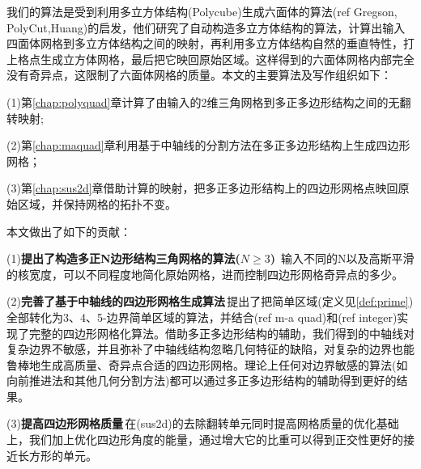我们的算法是受到利用多立方体结构(Polycube)生成六面体的算法(ref Gregson, PolyCut,Huang)的启发，他们研究了自动构造多立方体结构的算法，计算出输入四面体网格到多立方体结构之间的映射，再利用多立方体结构自然的垂直特性，打上格点生成立方体网格，最后把它映回原始区域。这样得到的六面体网格内部完全没有奇异点，这限制了六面体网格的质量。本文的主要算法及写作组织如下：

(1)第\ref{chap:polyquad}章计算了由输入的2维三角网格到多正多边形结构之间的无翻转映射;

(2)第\ref{chap:maquad}章利用基于中轴线的分割方法在多正多边形结构上生成四边形网格；

(3)第\ref{chap:sus2d}章借助计算的映射，把多正多边形结构上的四边形网格点映回原始区域，并保持网格的拓扑不变。%

本文做出了如下的贡献：

(1)\textbf{提出了构造多正N边形结构三角网格的算法($N \geq 3$)} \,输入不同的N以及高斯平滑的核宽度，可以不同程度地简化原始网格，进而控制四边形网格奇异点的多少。%

(2)\textbf{完善了基于中轴线的四边形网格生成算法}\,提出了把简单区域(定义见\ref{def:prime})全部转化为3、4、5-边界简单区域的算法，并结合(ref m-a quad)和(ref integer)实现了完整的四边形网格化算法。借助多正多边形结构的辅助，我们得到的中轴线对复杂边界不敏感，并且弥补了中轴线结构忽略几何特征的缺陷，对复杂的边界也能鲁棒地生成高质量、奇异点合适的四边形网格。理论上任何对边界敏感的算法(如向前推进法和其他几何分割方法)都可以通过多正多边形结构的辅助得到更好的结果。

(3)\textbf{提高四边形网格质量}\,在(sus2d)的去除翻转单元同时提高网格质量的优化基础上，我们加上优化四边形角度的能量，通过增大它的比重可以得到正交性更好的接近长方形的单元。
